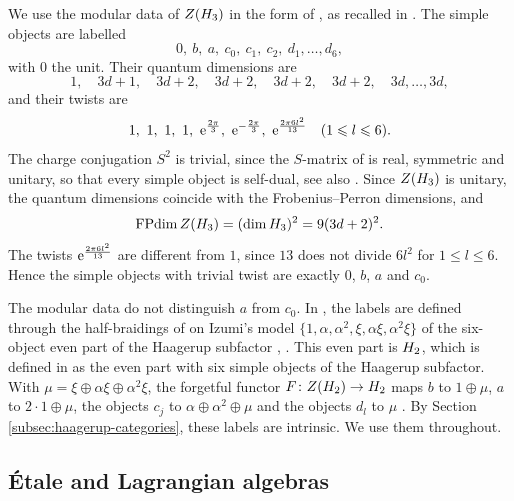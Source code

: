 \documentclass[leqno]{article}
\let\cal\relax
\newcommand{\cal}{\mathcal}
\renewcommand{\leq}{\ensuremath{\leqslant}}
\newcommand{\co}{\colon}
\let\i\relax %
\newcommand{\i}{\mathrm{i}}
\newcommand{\e}{\mathrm{e}} %
\numberwithin{equation}{section}
\begin{document}
We use the modular data of $Z(\cal H_3)$ in the form of \cite[equations (2.5a) and (2.5b) p.~20]{EvG11}, as recalled in \cite[Section 2.1]{Arh26}. The simple objects are labelled
\[
0,\ b,\ a,\ c_0,\ c_1,\ c_2,\ d_1, \ldots, d_6,
\]
with $0$ the unit. Their quantum dimensions are
\begin{equation}
\label{eq:center-dimensions}
1,\quad 3d+1,\quad 3d+2,\quad 3d+2,\quad 3d+2,\quad 3d+2,\quad 3d, \ldots, 3d,
\end{equation}
and their twists are
\begin{equation}
\label{eq:center-twists}
1,\ 1,\ 1,\ 1,\ \e^{\frac{2\pi\i}{3}},\ \e^{-\frac{2\pi\i}{3}},\ \e^{\frac{2\pi\i 6l^2}{13}}\quad (1 \leq l \leq 6).
\end{equation}
The charge conjugation $S^2$ is trivial, since the $S$-matrix of \cite[(2.5a)--(2.5b) p.~20]{EvG11} is real, symmetric and unitary, so that every simple object is self-dual, see also \cite[Section 2.1]{Arh26}. Since $Z(\cal H_3)$ is unitary, the quantum dimensions coincide with the Frobenius--Perron dimensions, and
\begin{equation}
\label{eq:dim-center}
\operatorname{FPdim} Z(\cal H_3) = (\dim \cal H_3)^2 = 9(3d+2)^2.
\end{equation}
The twists $\e^{\frac{2\pi\i 6l^2}{13}}$ are different from $1$, since $13$ does not divide $6l^2$ for $1 \leq l \leq 6$. Hence the simple objects with trivial twist are exactly $0$, $b$, $a$ and $c_0$.

The modular data do not distinguish $a$ from $c_0$. In \cite{EvG11}, the labels are defined through the half-braidings of \cite[Section 8]{Izu01} on Izumi's model $\{1,\alpha,\alpha^2,\xi,\alpha\xi,\alpha^2\xi\}$ of the six-object even part of the Haagerup subfactor \cite[p.~17]{EvG11}, \cite[pp.~56--57]{Izu18}. This even part is $\cal H_2$, which is defined in \cite[p.~14]{GrS12} as the even part with six simple objects of the Haagerup subfactor. With $\mu = \xi \oplus \alpha\xi \oplus \alpha^2\xi$, the forgetful functor $F \co Z(\cal H_2) \to \cal H_2$ maps $b$ to $1 \oplus \mu$, $a$ to $2 \cdot 1 \oplus \mu$, the objects $c_j$ to $\alpha \oplus \alpha^2 \oplus \mu$ and the objects $d_l$ to $\mu$ \cite[p.~18]{EvG11}. By Section \ref{subsec:haagerup-categories}, these labels are intrinsic. We use them throughout.

\subsection{\'Etale and Lagrangian algebras}
\label{subsec:etale}
\end{document}
